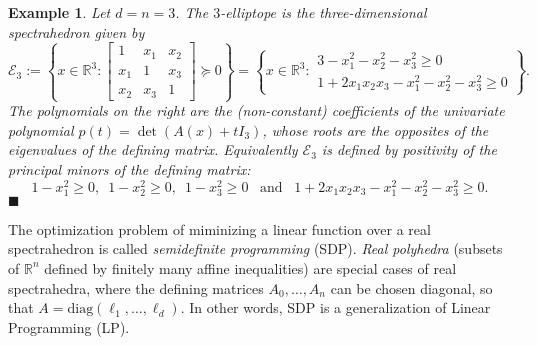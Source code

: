\documentclass[a4paper,oneside,10pt]{article}
\newtheorem{example}[theorem]{Example}
\newcommand{\R}{\mathbb{R}} %
\newcommand{\sym}{\mathbb{S}} %
\def\diag{\mathrm{diag}}
\newcommand{\exend}{\hfill $\blacksquare$}
\begin{document}
\begin{example}\label{ell3}
  Let $d=n=3$. The $3$-elliptope is the three-dimensional spectrahedron given by
  $$
  \mathcal{E}_3 :=
  \left\{
  x
  \in \R^3 :
  \begin{bmatrix}
    1 & x_1 & x_2 \\
    x_1 & 1 & x_3 \\
    x_2 & x_3 & 1
  \end{bmatrix}
  \succeq 0
  \right\}
  =
  \left\{
  x
  \in \R^3 :
  \begin{array}{r}
    3-x_1^2-x_2^2-x_3^2 \geq 0 \\
    1+2x_1x_2x_3-x_1^2-x_2^2-x_3^2 \geq 0
  \end{array}
  \right\}.
  $$
  The polynomials on the right are the (non-constant) coefficients of the univariate polynomial
  $p(t) = \det(A(x)+t I_3)$,
  whose roots are the opposites of the eigenvalues of the defining matrix. Equivalently $\mathcal{E}_3$
  is defined by positivity of the principal minors of the defining matrix:
  $$
  1-x_1^2 \geq 0, \,\,\, 1-x_2^2 \geq 0, \,\,\, 1-x_3^2 \geq 0 \,\,\, \text{ and } \,\,\, 1+2x_1x_2x_3-x_1^2-x_2^2-x_3^2 \geq 0.$$ \exend
\end{example}

The optimization problem of miminizing a linear function over a real spectrahedron is called \emph{semidefinite programming} (SDP).
{\it Real polyhedra} (subsets of $\R^n$ defined by finitely many affine inequalities) are special cases of real
spectrahedra, where the defining matrices $A_0, \ldots, A_n$ can be chosen diagonal, so that
$A = \diag(\ell_1,\ldots, \ell_d)$. In other words, SDP is a generalization of Linear Programming (LP).

\end{document}
